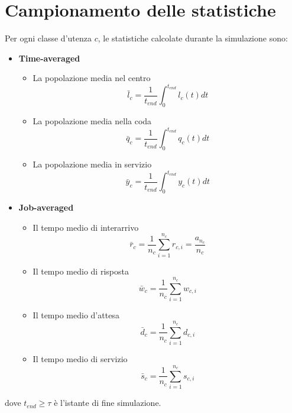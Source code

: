 \section{Campionamento delle statistiche}\label{sec:modello-computazionale-campionamento-stat}
Per ogni classe d'utenza $c$, le statistiche calcolate durante la simulazione sono:
\begin{itemize}
\item \textbf{Time-averaged}
\begin{itemize}
\item La popolazione media nel centro
\begin{equation}
\bar{l}_c=\frac{1}{t_{end}}\int_0^{t_{end}} l_c(t) dt
\end{equation}
\item La popolazione media nella coda
\begin{equation}
\bar{q}_c=\frac{1}{t_{end}}\int_0^{t_{end}} q_c(t) dt
\end{equation}
\item La popolazione media in servizio 
\begin{equation}
\bar{y}_c=\frac{1}{t_{end}}\int_0^{t_{end}} y_c(t) dt
\end{equation}
\end{itemize}
\item \textbf{Job-averaged}
\begin{itemize}
\item Il tempo medio di interarrivo
\begin{equation}
\bar{r}_c = \frac{1}{n_c} \sum_{i=1}^{n_c} r_{c,i} = \frac{a_{n_c}}{n_c}
\end{equation}
\item Il tempo medio di risposta
\begin{equation}
\bar{w}_c = \frac{1}{n_c} \sum_{i=1}^{n_c} w_{c,i}
\end{equation}
\item Il tempo medio d'attesa
\begin{equation}
\bar{d}_c = \frac{1}{n_c} \sum_{i=1}^{n_c} d_{c,i}
\end{equation}
\item Il tempo medio di servizio
\begin{equation}
\bar{s}_c = \frac{1}{n_c} \sum_{i=1}^{n_c} s_{c,i}
\end{equation}
\end{itemize}
\end{itemize}
dove $t_{end} \geq \tau$ è l'istante di fine simulazione.

